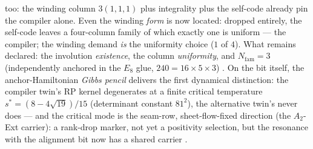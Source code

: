 \documentclass[11pt,a4paper]{article}
\newcommand{\Nfam}{N_{\mathrm{fam}}}
\theoremstyle{definition}
\begin{document}
\begin{keybox}
too: the winding column $3(1,1,1)$ plus integrality plus the self-code
already pin the compiler alone.  Even the winding \emph{form} is now
located: dropped entirely, the self-code leaves a four-column family of
which exactly one is uniform --- the compiler; the winding demand
\emph{is} the uniformity choice ($1$ of $4$).  What remains declared:
the involution \emph{existence}, the column \emph{uniformity}, and
$\Nfam=3$ (independently anchored in the $E_8$ glue,
$240=16\times5\times3$) \mE.  On the bit itself, the
anchor-Hamiltonian \emph{Gibbs pencil} delivers the first dynamical
distinction: the compiler twin's RP kernel degenerates at a finite
critical temperature $s^*=(8-4\sqrt{19})/15$ (determinant constant
$81^2$), the alternative twin's never does --- and the critical mode is
the seam-row, sheet-flow-fixed direction (the $A_2$-Ext carrier): a
rank-drop marker, not yet a positivity selection, but the resonance
with the alignment bit now has a shared carrier \mE.
\end{keybox}
\end{document}
